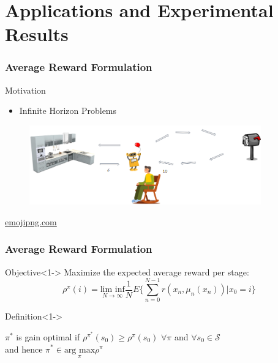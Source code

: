 \documentclass{beamer}
\begin{document}
\section{Applications and Experimental Results}
\begin{frame}
\frametitle{Average Reward Formulation}

Motivation
\begin{itemize}
    \item Infinite Horizon Problems
\end{itemize}
\begin{figure}
    \centering
    \includegraphics[width=10cm]{mot.png}
\end{figure}
\vfill\hfill\tiny{\href{https://www.emojipng.com/}{emojipng.com}}
\end{frame}


\begin{frame}
\frametitle{Average Reward Formulation}
\begin{block}{Objective}<1->
Maximize the expected average reward per stage:
    \[\rho^{\pi}(i)=\underset{N\rightarrow\infty}{\text{lim inf}}\dfrac{1}{N}E\Big\{\sum_{n=0}^{N-1}r(x_n,\mu_n(x_n))|x_0=i\Big\}\]
\end{block} 
\begin{block}{Definition}<1->
\begin{center}
$\pi^*$ is gain optimal if $\rho^{\pi^*}(s_0)\geq\rho^{\pi}(s_0)$ $\forall \pi$ and $\forall s_0 \in \mathcal{S}$\\
and hence $\pi^* \in \underset{\pi}{\text{arg max}} \rho^\pi$
\end{center}
\end{block} 

\end{frame}


    
\end{document}
